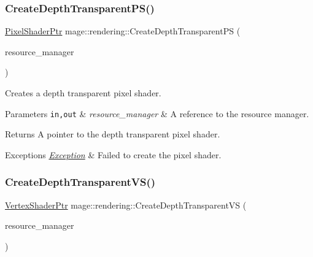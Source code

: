 \subsubsection{\texorpdfstring{Create\+Depth\+Transparent\+P\+S()}{CreateDepthTransparentPS()}}
{\footnotesize\ttfamily \mbox{\hyperlink{namespacemage_1_1rendering_af03d922b228ee9c8542baaa2ecc9f259}{Pixel\+Shader\+Ptr}} mage\+::rendering\+::\+Create\+Depth\+Transparent\+PS (\begin{DoxyParamCaption}\item[{\mbox{\hyperlink{classmage_1_1rendering_1_1_resource_manager}{Resource\+Manager}} \&}]{resource\+\_\+manager }\end{DoxyParamCaption})}

Creates a depth transparent pixel shader.


\begin{DoxyParams}[1]{Parameters}
\mbox{\tt in,out}  & {\em resource\+\_\+manager} & A reference to the resource manager. \\
\hline
\end{DoxyParams}
\begin{DoxyReturn}{Returns}
A pointer to the depth transparent pixel shader. 
\end{DoxyReturn}

\begin{DoxyExceptions}{Exceptions}
{\em \mbox{\hyperlink{classmage_1_1_exception}{Exception}}} & Failed to create the pixel shader. \\
\hline
\end{DoxyExceptions}
\mbox{\label{namespacemage_1_1rendering_afe609dd7d958d13de0d47f7619aeb74c}} 
\subsubsection{\texorpdfstring{Create\+Depth\+Transparent\+V\+S()}{CreateDepthTransparentVS()}}
{\footnotesize\ttfamily \mbox{\hyperlink{namespacemage_1_1rendering_aaf704b9c54a4181f4950a1761de69dda}{Vertex\+Shader\+Ptr}} mage\+::rendering\+::\+Create\+Depth\+Transparent\+VS (\begin{DoxyParamCaption}\item[{\mbox{\hyperlink{classmage_1_1rendering_1_1_resource_manager}{Resource\+Manager}} \&}]{resource\+\_\+manager }\end{DoxyParamCaption})}

